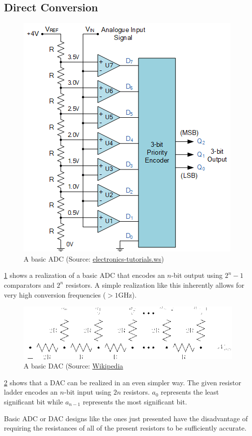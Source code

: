 \documentclass{report}
\newcommand*{\newpar}{\par\vspace{\baselineskip}\noindent} %
\begin{document}
\subsection{Direct Conversion}
\begin{figure}[h!]
\centering
\includegraphics[scale=2]{figures/ADC}
\caption{A basic ADC (Source: \href{https://www.electronics-tutorials.ws/combination/analogue-to-digital-converter.html}{electronics-tutorials.ws})}
\label{fig:ADC}
\end{figure}
\ref{fig:ADC} shows a realization of a basic ADC that encodes an $n$-bit output using $2^n - 1$ comparators and $2^n$ resistors. A simple realization like this inherently allows for very high conversion frequencies ($> 1$GHz).
\begin{figure}[h!]
\centering
\includegraphics[scale=0.5]{figures/DAC}
\caption{A basic DAC (Source: \href{https://en.wikipedia.org/wiki/File:R2r-ladder.png}{Wikipedia}}
\label{fig:DAC}
\end{figure}
\newpar
\ref{fig:DAC} shows that a DAC can be realized in an even simpler way. The given resistor ladder  encodes an $n$-bit input using $2n$ resistors. $a_0$ represents the least significant bit while $a_{n-1}$ represents the most significant bit.
\newpar
Basic ADC or DAC designs like the ones just presented have the disadvantage of requiring the resistances of all of the present resistors to be sufficiently accurate.
\end{document}
